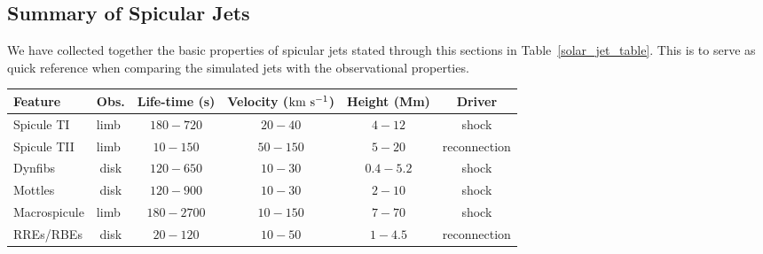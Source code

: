 \documentclass[12pt]{ociamthesis}
\begin{document}
\subsection{Summary of Spicular Jets}
\label{subsec:jet_table}
We have collected together the basic properties of spicular jets stated through this sections in Table~\ref{solar_jet_table}. This is to serve as quick reference when comparing the simulated jets with the observational properties.  
\begin{landscape}%
\begin{table*}
\caption{Values based on cited papers throughout Section~\ref{sec:spicule-jets}}
\label{solar_jet_table}
\begin{center}
\begin{tabular}{|l|l|l|l|l|p{1.7cm}|}
\hline
\textbf{Feature} & \multicolumn{1}{c|}{\textbf{Obs.}} & \multicolumn{1}{c|}{\textbf{Life-time (s)}} & \multicolumn{1}{c|}{\textbf{Velocity ($\rm{km \ s^{-1}}$)}} & \multicolumn{1}{c|}{\textbf{Height (Mm)}} & \multicolumn{1}{c|}{\textbf{Driver}} \\ \hline

Spicule TI  & limb &   \multicolumn{1}{c|}{$180-720$} & \multicolumn{1}{c|}{$20-40$} &  \multicolumn{1}{c|}{$4-12$}  & \multicolumn{1}{c|}{shock} \\ \hline

Spicule TII & limb & \multicolumn{1}{c|}{$ 10-150$} & \multicolumn{1}{c|}{$ 50-150$} & \multicolumn{1}{c|}{$5-20$}  & \multicolumn{1}{c|}{reconnection}  \\ \hline

Dynfibs & \multicolumn{1}{c|}{disk} & \multicolumn{1}{c|}{$120-650$} & \multicolumn{1}{c|}{$10-30$} & \multicolumn{1}{c|}{$0.4-5.2$} & \multicolumn{1}{c|}{shock} \\ \hline

Mottles & \multicolumn{1}{c|}{disk} & \multicolumn{1}{c|}{$120-900$} & \multicolumn{1}{c|}{$10-30$} & \multicolumn{1}{c|}{$2-10$} & \multicolumn{1}{c|}{shock} \\ \hline

Macrospicule & limb  & \multicolumn{1}{c|}{$180-2700$} & \multicolumn{1}{c|}{$10-150$}  & \multicolumn{1}{c|}{$7-70$} & \multicolumn{1}{c|}{shock} \\ \hline

RREs/RBEs & \multicolumn{1}{c|}{disk}  & \multicolumn{1}{c|}{$20-120$} & \multicolumn{1}{c|}{$10-50$}  & \multicolumn{1}{c|}{$1-4.5$} & \multicolumn{1}{c|}{reconnection} \\ \hline
\end{tabular}
\end{center}
\end{table*}
\end{landscape}
\end{document}
